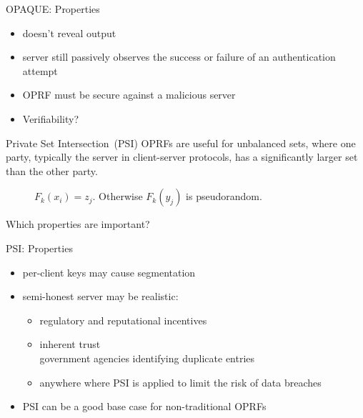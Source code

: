 \documentclass[10pt]{beamer}
\begin{document}
  \begin{frame}{OPAQUE: Properties}
    \begin{itemize}
      \item doesn't reveal output\pause
      \item server still passively observes the success or failure of an authentication
        attempt\pause
      \item OPRF must be secure against a malicious server\pause
      \item Verifiability?
    \end{itemize}
  \end{frame}
  
  
  \begin{frame}{Private Set Intersection~(PSI)}
    OPRFs are useful for \alert{unbalanced} sets, where one party, typically the
    server in client-server protocols, has a significantly larger set than the other party.
    \begin{figure}
      \centering
        \(F_{k}(x_i) = z_{j}\).
        Otherwise \(F_{k}(y_j)\) is pseudorandom.
    \end{figure}\pause
    \hspace*{\fill} \alert{Which properties are important?}
  \end{frame}
  
  \begin{frame}{PSI: Properties}
    \begin{itemize}
      \item per-client keys may cause segmentation \pause
      \item semi-honest server may be realistic: \pause
        \begin{itemize}
          \item regulatory and reputational incentives~\cite{USENIX:KRSSW19}\pause
          \item inherent trust\\ government agencies identifying duplicate entries\pause
          \item anywhere where PSI is applied to limit the risk of data breaches
            \pause
        \end{itemize}
      \item PSI can be a good base case for non-traditional OPRFs
    \end{itemize}
  \end{frame}
\end{document}
